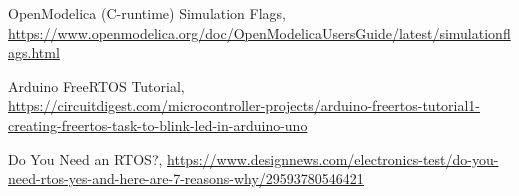 \documentclass[12pt]{report}
\begin{document}
\begin{thebibliography}{111}
OpenModelica (C-runtime) Simulation Flags, \url{https://www.openmodelica.org/doc/OpenModelicaUsersGuide/latest/simulationflags.html}

Arduino FreeRTOS Tutorial,\\
\url{https://circuitdigest.com/microcontroller-projects/arduino-freertos-tutorial1-creating-freertos-task-to-blink-led-in-arduino-uno}

Do You Need an RTOS?, \url{https://www.designnews.com/electronics-test/do-you-need-rtos-yes-and-here-are-7-reasons-why/29593780546421}
\end{thebibliography}
\end{document}
